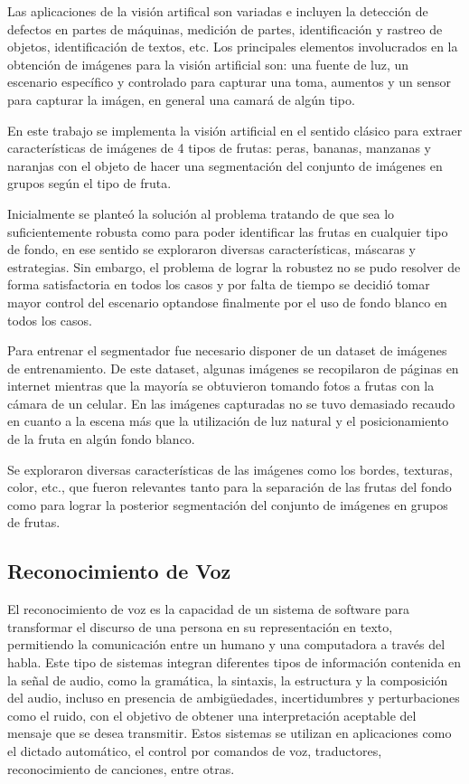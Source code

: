 \documentclass[a4paper, 12pt]{article}
\begin{document}
Las aplicaciones de la visión artifical son variadas e incluyen la detección de defectos en partes de máquinas, medición de partes, identificación y rastreo de objetos, identificación de textos, etc.
Los principales elementos involucrados en la obtención de imágenes para la visión artificial son: una fuente de luz, un escenario específico y controlado para capturar una toma, aumentos y un sensor para capturar la imágen, en general una camará de algún tipo.

En este trabajo se implementa la visión artificial en el sentido clásico para extraer características de imágenes de 4 tipos de frutas: peras, bananas, manzanas y naranjas con el objeto de hacer una segmentación del conjunto de imágenes en grupos según el tipo de fruta.

Inicialmente se planteó la solución al problema tratando de que sea lo suficientemente robusta como para poder identificar las frutas en cualquier tipo de fondo, en ese sentido se exploraron diversas características, máscaras y estrategias. Sin embargo, el problema de lograr la robustez no se pudo resolver de forma satisfactoria en todos los casos y por falta de tiempo se decidió tomar mayor control del escenario optandose finalmente por el uso de fondo blanco en todos los casos.

Para entrenar el segmentador fue necesario disponer de un dataset de imágenes de entrenamiento. De este dataset, algunas imágenes se recopilaron de páginas en internet mientras que la mayoría se obtuvieron tomando fotos a frutas con la cámara de un celular. En las imágenes capturadas no se tuvo demasiado recaudo en cuanto a la escena más que la utilización de luz natural y el posicionamiento de la fruta en algún fondo blanco.

Se exploraron diversas características de las imágenes como los bordes, texturas, color, etc., que fueron relevantes tanto para la separación de las frutas del fondo como para lograr la posterior segmentación del conjunto de imágenes en grupos de frutas.
\subsection{Reconocimiento de Voz}

El reconocimiento de voz es la capacidad de un sistema de software para transformar el discurso de una persona en su representación en texto, permitiendo la comunicación entre un humano y una computadora a través del habla. Este tipo de sistemas integran diferentes tipos de información contenida en la señal de audio, como la gramática, la sintaxis, la estructura y la composición del audio, incluso en presencia de ambigüedades, incertidumbres y perturbaciones como el ruido, con el objetivo de obtener una interpretación aceptable del mensaje que se desea transmitir. Estos sistemas se utilizan en aplicaciones como el dictado automático, el control por comandos de voz, traductores, reconocimiento de canciones, entre otras.
\end{document}
